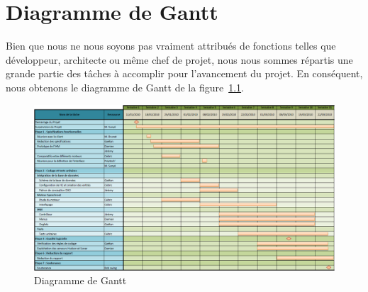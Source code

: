 \chapter{Diagramme de Gantt}

Bien que nous ne nous soyons pas vraiment attribués de fonctions telles que développeur, architecte ou même chef de projet, nous nous sommes répartis une grande partie des tâches à accomplir pour l'avancement du projet.
En conséquent, nous obtenons le diagramme de Gantt de la figure~\ref{fig:gantt}.

\begin{figure}[h!]
 \centering
 \includegraphics[width=16cm]{./images/Gantt.png}
 \caption{Diagramme de Gantt}
 \label{fig:gantt}
\end{figure}


\printindex
